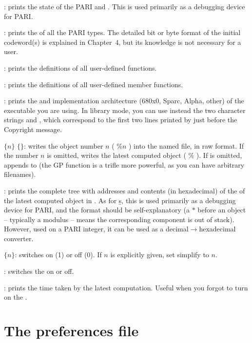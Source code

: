 : prints the state of the PARI  and .
This is used primarily as a debugging device for PARI.

: prints the  of all the PARI
types. The detailed bit or byte format of the initial codeword(s) is
explained in Chapter~4, but its knowledge is not necessary for a  user.

: prints the definitions of all user-defined functions.

: prints the definitions of all user-defined member functions.

: prints the  and implementation architecture
(680x0, Sparc, Alpha, other) of the  executable you are using. In library
mode, you can use instead the two character strings  and
, which correspond to the first two lines printed by  just
before the Copyright message.

 $\{n\}$ $\{$$\}$: writes the object number
$n$ ( $\%n$ ) into the named file, in raw format. If the number $n$ is
omitted, writes the latest computed object ( $\%$ ). If  is
omitted, appends to  (the GP function  is a trifle more
powerful, as you can have arbitrary filenames).

: prints the complete tree with addresses and contents (in
hexadecimal) of the  of the latest computed
object in . As for \b{s}, this is used primarily as a debugging device for
PARI, and the format should be self-explanatory (a $*$ before an object --
typically a modulus -- means the corresponding component is out of stack).
However, used on a PARI integer, it can be used as a
decimal$\rightarrow$hexadecimal converter.

 $\{n\}$: switches  on (1) or off (0). If $n$
is explicitly given, set simplify to $n$.

\subseckbd{\#}: switches the  on or off.

\subseckbd{\#\#}: prints the time taken by the latest computation.
Useful when you forgot to turn on the .


\section{The preferences file}
\label{se:gprc}

